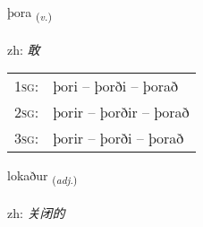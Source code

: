 \documentclass[frontgrid, backgrid]{flacards}\usepackage[]{graphicx}\usepackage[]{color}
\begin{document}
\renewcommand{\flhead}{\vskip5pt \fboxsep=0pt {\small\bfseries\footnotesize Sagnorð | 动词}}
\renewcommand{\fcfoot}{\vskip5pt \fboxsep=0pt \hspace{2pt}{\small\bfseries\footnotesize 2K}}

\renewcommand{\blhead}{\vskip5pt {\small\bfseries\footnotesize Sagnorð | 动词 }}
\renewcommand{\bcfoot}{\vskip5pt \hspace{2pt}{\small\bfseries\footnotesize 2K}}


{þora \small{\textsubscript{(\textit{v.})}} \\[1ex] %
\textphonetic{[θɔːra]} \\
zh: \emph{敢} \\  [2ex]
\renewcommand*{\arraystretch}{0.8}
\begin{tabular}{p{1cm}l}
\textsc{1sg}: & þori -- þorði -- þorað \\ 
\textsc{2sg}: & þorir -- þorðir -- þorað \\ 
\textsc{3sg}: & þorir -- þorði -- þorað \\ 
\end{tabular}
}

\renewcommand{\flhead}{\vskip5pt \fboxsep=0pt {\small\bfseries\footnotesize Lýsingarorð | 形容词}}
\renewcommand{\fcfoot}{\vskip5pt \fboxsep=0pt \hspace{2pt}{\small\bfseries\footnotesize 2K}}

\renewcommand{\blhead}{\vskip5pt {\small\bfseries\footnotesize Lýsingarorð | 形容词 }}
\renewcommand{\bcfoot}{\vskip5pt \hspace{2pt}{\small\bfseries\footnotesize 2K}}


{lokaður \small{\textsubscript{(\textit{adj.})}} \\[1ex] %
\textphonetic{[lɔːkaðʏr]} \\
zh: \emph{关闭的} \\  [2ex]
\renewcommand*{\arraystretch}{0.8}
}
\end{document}
